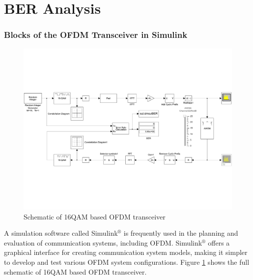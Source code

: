 \documentclass{article}
\numberwithin{figure}{section}
\numberwithin{equation}{section}
\begin{document}
\part{BER Analysis}

\section{Blocks of the OFDM Transceiver in Simulink}
\begin{figure}[!ht]
    \centering
    \includegraphics[width=1\textwidth]{images/simulink.pdf}
    \caption{Schematic of 16QAM based OFDM transceiver}
    \label{fig:simulink}
\end{figure}
A simulation software called Simulink$^\circledR$ is frequently used in the planning and evaluation of communication systems, including OFDM. Simulink$^\circledR$ offers a graphical interface for creating communication system models, making it simpler to develop and test various OFDM system configurations. Figure \ref{fig:simulink} shows the full schematic of 16QAM based OFDM transceiver.
\end{document}
